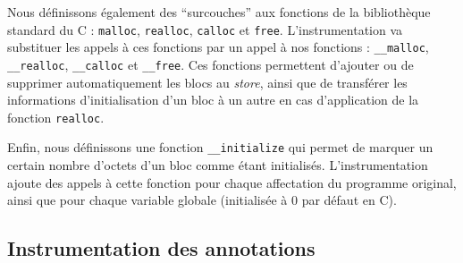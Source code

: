 Nous définissons également des ``surcouches'' aux fonctions de la bibliothèque
standard du C : \lstinline'malloc', \lstinline'realloc', \lstinline'calloc' et
\lstinline'free'.
L'instrumentation va substituer les appels à ces fonctions par un appel à nos
fonctions : \lstinline'__malloc', \lstinline'__realloc', \lstinline'__calloc'
et \lstinline'__free'.
Ces fonctions permettent d'ajouter ou de supprimer automatiquement les blocs
au \textit{store}, ainsi que de transférer les informations d'initialisation
d'un bloc à un autre en cas d'application de la fonction \lstinline'realloc'.

Enfin, nous définissons une fonction \lstinline'__initialize' qui permet de
marquer un certain nombre d'octets d'un bloc comme étant initialisés.
L'instrumentation ajoute des appels à cette fonction pour chaque affectation du
programme original, ainsi que pour chaque variable globale (initialisée à 0 par
défaut en C).


\subsection{Instrumentation des annotations}


